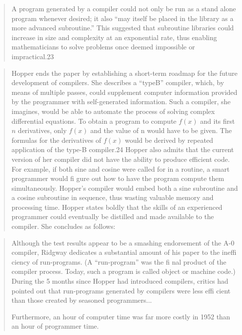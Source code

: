\begin{quotation}
A program generated by a compiler could not only be
run as a stand alone program whenever desired; it also “may itself
be placed in the library as a more advanced subroutine.” This
suggested that subroutine libraries could increase in size and
complexity at an exponential rate, thus enabling mathematicians
to solve problems once deemed impossible or impractical.23
\end{quotation}

\begin{quotation}
Hopper ends the paper by establishing a short-term roadmap
for the future development of compilers. She describes a “typeB” compiler, which, by means of multiple passes, could supplement computer information provided by the programmer with
self-generated information. Such a compiler, she imagines, would
be able to automate the process of solving complex differential
equations. To obtain a program to compute $f(x)$ and its first $n$
derivatives, only $f(x)$ and the value of n would have to be given.
The formulas for the derivatives of $f(x)$ would be derived by
repeated application of the type-B compiler.24
Hopper also admits that the current version of her compiler
did not have the ability to produce efficient code. For example,
if both sine and cosine were called for in a routine, a smart
programmer would fi gure out how to have the program compute them simultaneously. Hopper’s compiler would embed both
a sine subroutine and a cosine subroutine in sequence, thus
wasting valuable memory and processing time. Hopper states
boldly that the skills of an experienced programmer could eventually be distilled and made available to the compiler. She concludes as follows:
\end{quotation}

\begin{quotation}
Although the test results appear to be a smashing endorsement
of the A-0 compiler, Ridgway dedicates a substantial amount of
his paper to the ineffi ciency of run-programs. (A “run-program”
was the fi nal product of the compiler process. Today, such a
program is called object or machine code.) During the 5 months
since Hopper had introduced compilers, critics had pointed out
that run-programs generated by compilers were less effi cient than
those created by seasoned programmers... 

Furthermore, an hour of computer time was far more costly in 1952 than an hour of programmer time. 
\end{quotation}

